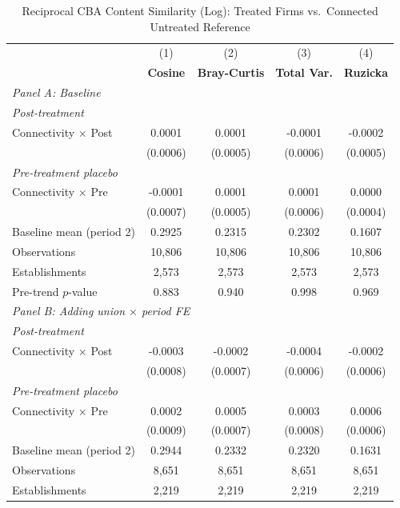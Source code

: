 \begin{table}[H]
\centering
\caption{Reciprocal CBA Content Similarity (Log): Treated Firms vs.\ Connected Untreated Reference}
\label{tab:treated_ln_cba_similarity}
\scriptsize
\setlength{\tabcolsep}{8pt}
\begin{tabular}{lcccc}
\toprule\toprule
 & (1) & (2) & (3) & (4) \\
 & \textbf{Cosine} & \textbf{Bray-Curtis} & \textbf{Total Var.} & \textbf{Ruzicka} \\
\midrule
\multicolumn{5}{l}{\textit{Panel A: Baseline}} \\
\multicolumn{5}{l}{\textit{Post-treatment}} \\
Connectivity $\times$ Post & 0.0001 & 0.0001 & -0.0001 & -0.0002 \\
 & (0.0006) & (0.0005) & (0.0006) & (0.0005) \\
\multicolumn{5}{l}{\textit{Pre-treatment placebo}} \\
Connectivity $\times$ Pre & -0.0001 & 0.0001 & 0.0001 & 0.0000 \\
 & (0.0007) & (0.0005) & (0.0006) & (0.0004) \\
\midrule
Baseline mean (period 2) & 0.2925 & 0.2315 & 0.2302 & 0.1607 \\
Observations &       10,806 &       10,806 &       10,806 &       10,806 \\
Establishments &        2,573 &        2,573 &        2,573 &        2,573 \\
Pre-trend $p$-value & 0.883 & 0.940 & 0.998 & 0.969 \\
\midrule
\multicolumn{5}{l}{\textit{Panel B: Adding union $\times$ period FE}} \\
\multicolumn{5}{l}{\textit{Post-treatment}} \\
Connectivity $\times$ Post & -0.0003 & -0.0002 & -0.0004 & -0.0002 \\
 & (0.0008) & (0.0007) & (0.0006) & (0.0006) \\
\multicolumn{5}{l}{\textit{Pre-treatment placebo}} \\
Connectivity $\times$ Pre & 0.0002 & 0.0005 & 0.0003 & 0.0006 \\
 & (0.0009) & (0.0007) & (0.0008) & (0.0006) \\
\midrule
Baseline mean (period 2) & 0.2944 & 0.2332 & 0.2320 & 0.1631 \\
Observations &        8,651 &        8,651 &        8,651 &        8,651 \\
Establishments &        2,219 &        2,219 &        2,219 &        2,219 \\

\end{tabular}
\end{table}
